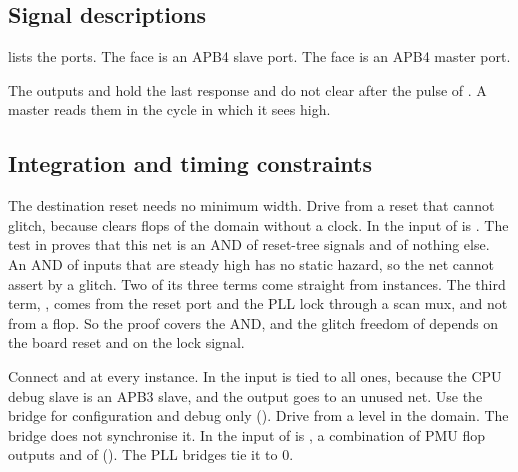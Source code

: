 

\subsection{Signal descriptions}
 lists the ports. The  face is an APB4 slave port. The  face is an APB4 master port.



The outputs  and  hold the last response and do not clear after the pulse of . A master reads them in the cycle in which it sees  high.

\subsection{Integration and timing constraints}
The destination reset needs no minimum width. Drive  from a reset that cannot glitch, because  clears flops of the  domain without a clock. In  the input  of  is . The test  in  proves that this net is an AND of reset-tree signals and of nothing else. An AND of inputs that are steady high has no static hazard, so the net cannot assert by a glitch. Two of its three terms come straight from  instances. The third term, , comes from the reset port and the PLL lock through a scan mux, and not from a flop. So the proof covers the AND, and the glitch freedom of  depends on the board reset and on the lock signal.

Connect  and  at every instance. In  the input  is tied to all ones, because the CPU debug slave is an APB3 slave, and the output  goes to an unused net. Use the bridge for configuration and debug only (). Drive  from a level in the  domain. The bridge does not synchronise it. In  the input of  is , a combination of PMU flop outputs and of  (). The PLL bridges tie it to 0.

